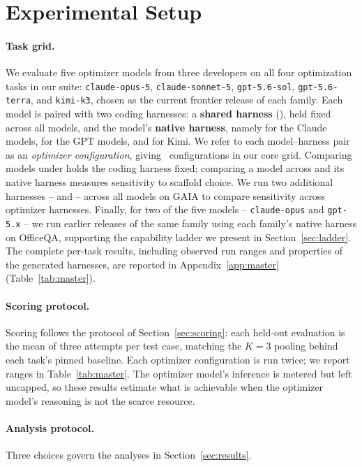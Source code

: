 \section{Experimental Setup}
\label{sec:setup}

\paragraph{Task grid.}
We evaluate five optimizer models from three developers on all four optimization tasks in our suite:
\texttt{claude-opus-5}, \texttt{claude-sonnet-5}, \texttt{gpt-5.6-sol},
\texttt{gpt-5.6-terra}, and \texttt{kimi-k3}, chosen as the current frontier
release of each family. Each model is paired with two coding harnesses: a
\textbf{shared harness} (\oc), held fixed across all models, and the model's
\textbf{native harness}, namely \cc for the Claude models, \codex for the GPT
models, and \kc for Kimi. We refer to each model--harness pair as an
\emph{optimizer configuration}, giving \NumGridOptimizers\ configurations in our core grid. Comparing models under \oc holds the coding harness fixed; comparing a model
across \oc and its native harness measures sensitivity to scaffold choice. 
We run two additional harnesses -- \goose and \miniswe -- across all models on GAIA to compare sensitivity across optimizer harnesses. Finally, for two of the five models -- \texttt{claude-opus} and \texttt{gpt-5.x} -- we run earlier releases of the same family using each family's native harness on OfficeQA,
supporting the capability ladder we present in Section~\ref{sec:ladder}.
The complete per-task results, including observed run ranges and properties of
the generated harnesses, are reported in Appendix~\ref{app:master}
(Table~\ref{tab:master}).

\paragraph{Scoring protocol.}
Scoring follows the protocol of Section~\ref{sec:scoring}: each held-out evaluation is the
mean of three attempts per test case, matching the $K{=}3$ pooling behind each
task's pinned baseline. Each optimizer configuration is run twice; we report
ranges in Table~\ref{tab:master}. The optimizer model's inference is metered but left
uncapped, so these results estimate what is achievable when the optimizer model's
reasoning is not the scarce resource.

\paragraph{Analysis protocol.}
\label{sec:analysis}
Three choices govern the analyses in Section~\ref{sec:results}.

